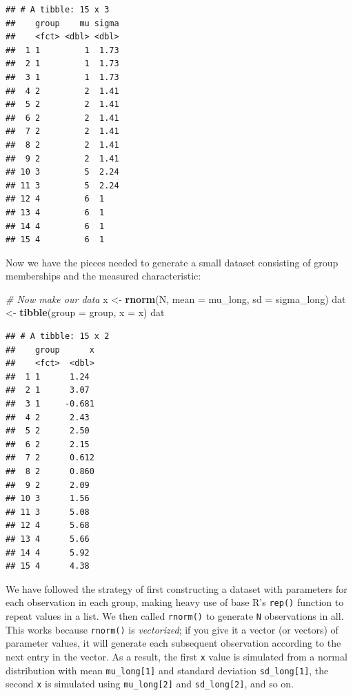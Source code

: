 \documentclass[
]{book}
\newenvironment{Shaded}{\begin{snugshade}}{\end{snugshade}}
\newcommand{\AttributeTok}[1]{\textcolor[rgb]{0.13,0.29,0.53}{#1}}
\newcommand{\CommentTok}[1]{\textcolor[rgb]{0.56,0.35,0.01}{\textit{#1}}}
\newcommand{\FunctionTok}[1]{\textcolor[rgb]{0.13,0.29,0.53}{\textbf{#1}}}
\newcommand{\NormalTok}[1]{#1}
\newcommand{\OtherTok}[1]{\textcolor[rgb]{0.56,0.35,0.01}{#1}}
\begin{document}
\begin{verbatim}
## # A tibble: 15 x 3
##    group    mu sigma
##    <fct> <dbl> <dbl>
##  1 1         1  1.73
##  2 1         1  1.73
##  3 1         1  1.73
##  4 2         2  1.41
##  5 2         2  1.41
##  6 2         2  1.41
##  7 2         2  1.41
##  8 2         2  1.41
##  9 2         2  1.41
## 10 3         5  2.24
## 11 3         5  2.24
## 12 4         6  1   
## 13 4         6  1   
## 14 4         6  1   
## 15 4         6  1
\end{verbatim}

Now we have the pieces needed to generate a small dataset consisting of group memberships and the measured characteristic:

\begin{Shaded}
\begin{Highlighting}[]
\CommentTok{\# Now make our data}
\NormalTok{x }\OtherTok{\textless{}{-}} \FunctionTok{rnorm}\NormalTok{(N, }\AttributeTok{mean =}\NormalTok{ mu\_long, }\AttributeTok{sd =}\NormalTok{ sigma\_long)}
\NormalTok{dat }\OtherTok{\textless{}{-}} \FunctionTok{tibble}\NormalTok{(}\AttributeTok{group =}\NormalTok{ group, }\AttributeTok{x =}\NormalTok{ x)}
\NormalTok{dat}
\end{Highlighting}
\end{Shaded}

\begin{verbatim}
## # A tibble: 15 x 2
##    group      x
##    <fct>  <dbl>
##  1 1      1.24 
##  2 1      3.07 
##  3 1     -0.681
##  4 2      2.43 
##  5 2      2.50 
##  6 2      2.15 
##  7 2      0.612
##  8 2      0.860
##  9 2      2.09 
## 10 3      1.56 
## 11 3      5.08 
## 12 4      5.68 
## 13 4      5.66 
## 14 4      5.92 
## 15 4      4.38
\end{verbatim}

We have followed the strategy of first constructing a dataset with parameters for each observation in each group, making heavy use of base R's \texttt{rep()} function to repeat values in a list.
We then called \texttt{rnorm()} to generate \texttt{N} observations in all.
This works because \texttt{rnorm()} is \emph{vectorized}; if you give it a vector (or vectors) of parameter values, it will generate each subsequent observation according to the next entry in the vector. As a result, the first \texttt{x} value is simulated from a normal distribution with mean \texttt{mu\_long{[}1{]}} and standard deviation \texttt{sd\_long{[}1{]}}, the second \texttt{x} is simulated using \texttt{mu\_long{[}2{]}} and \texttt{sd\_long{[}2{]}}, and so on.
\end{document}
